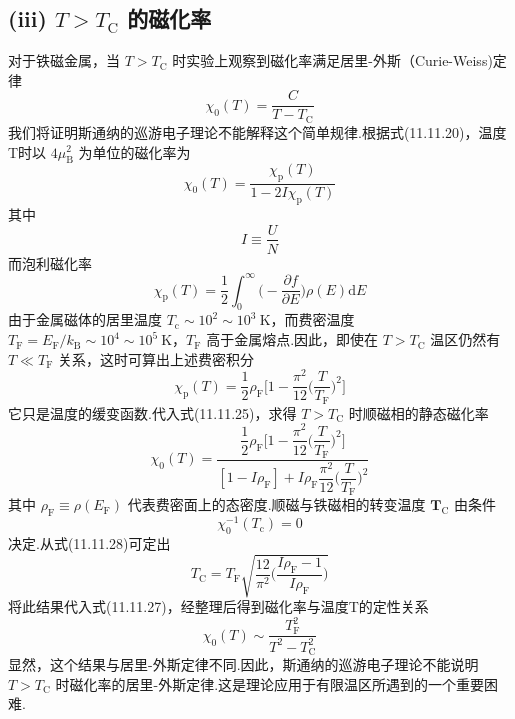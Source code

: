 \subsection*{(iii) $T>T_{\mathrm{C}}$ 的磁化率}

对于铁磁金属，当 $T>T_{\mathrm{C}}$ 时实验上观察到磁化率满足居里-外斯（Curie-Weiss)定律
\begin{equation}
  \chi_{0}(T)=\frac{C}{T-T_{\mathrm{C}}}
\end{equation}
我们将证明斯通纳的巡游电子理论不能解释这个简单规律.根据式(11.11.20)，温度T时以 $4\mu_{\mathrm{B}}^{2}$ 为单位的磁化率为
\begin{equation}
  \chi_{0}(T)=\frac{\chi_{\mathrm{p}}(T)}{1-2I\chi_{\mathrm{p}}(T)}
\end{equation}
其中
\begin{equation*}
  I\equiv\frac{U}{N}
\end{equation*}
而泡利磁化率
\begin{equation*}
  \chi_{\mathrm{p}}(T)=\frac{1}{2}\int_{0}^{\infty}\biggl(-\frac{\partial f}{\partial E}\biggr)\rho(E)\mathrm{d}E
\end{equation*}
由于金属磁体的居里温度 $T_{\mathrm{c}}\sim 10^{2}\sim 10^{3}\ \mathrm{K}$，而费密温度 $T_{\mathrm{F}}=E_{\mathrm{F}}/k_{\mathrm{B}}\sim 10^{4}\sim 10^{5}\ \mathrm{K}$，$T_{\mathrm{F}}$ 高于金属熔点.因此，即使在 $T>T_{\mathrm{C}}$ 温区仍然有 $T\ll T_{\mathrm{F}}$ 关系，这时可算出上述费密积分
\begin{equation}
  \chi_{\mathrm{p}}(T)=\frac{1}{2}\rho_{\mathrm{F}}\biggl[1-\frac{\pi^{2}}{12}\biggl(\frac{T}{T_{\mathrm{F}}}\biggr)^{2}\biggr]
\end{equation}
它只是温度的缓变函数.代入式(11.11.25)，求得 $T>T_{\mathrm{C}}$ 时顺磁相的静态磁化率
\begin{equation}
  \chi_{0}(T)=\frac{\dfrac{1}{2}\rho_{\mathrm{F}}\biggl[1-\dfrac{\pi^{2}}{12}\biggl(\dfrac{T}{T_{\mathrm{F}}}\biggr)^{2}\biggr]}
  {[1-I\rho_{\mathrm{F}}]+I\rho_{\mathrm{F}}\dfrac{\pi^{2}}{12}\biggl(\dfrac{T}{T_{\mathrm{F}}}\biggr)^{2}}
\end{equation}
其中 $\rho_{\mathrm{F}}\equiv\rho(E_{\mathrm{F}})$ 代表费密面上的态密度.顺磁与铁磁相的转变温度 $\boldsymbol{T}_{\mathrm{C}}$ 由条件
\begin{equation}
  \chi_{0}^{-1}(T_{\mathrm{c}})=0
\end{equation}
决定.从式(11.11.28)可定出
\begin{equation}
  T_{\mathrm{C}}=T_{\mathrm{F}}\sqrt{\frac{12}{\pi^{2}}\biggl(\frac{I\rho_{\mathrm{F}}-1}{I\rho_{\mathrm{F}}}\biggr)}
\end{equation}
将此结果代入式(11.11.27)，经整理后得到磁化率与温度T的定性关系
\begin{equation}
  \chi_{0}(T)\sim\frac{T_{\mathrm{F}}^{2}}{T^{2}-T_{\mathrm{C}}^{2}}
\end{equation}
显然，这个结果与居里-外斯定律不同.因此，斯通纳的巡游电子理论不能说明 $T>T_{\mathrm{C}}$ 时磁化率的居里-外斯定律.这是理论应用于有限温区所遇到的一个重要困难.

